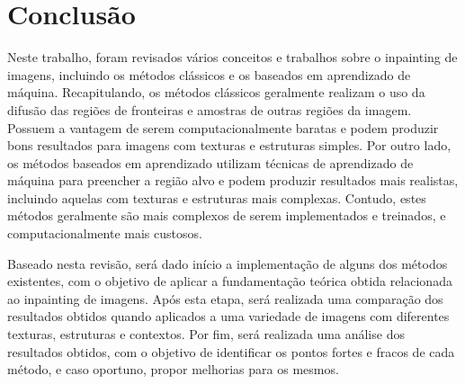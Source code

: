 
\section{Conclusão} \label{conclusion}
Neste trabalho, foram revisados vários conceitos e trabalhos sobre o inpainting de imagens, incluindo os métodos clássicos e os baseados em aprendizado de máquina. Recapitulando, os métodos clássicos geralmente realizam o uso da difusão das regiões de fronteiras e amostras de outras regiões da imagem. Possuem a vantagem de serem computacionalmente baratas e podem produzir bons resultados para imagens com texturas e estruturas simples. Por outro lado, os métodos baseados em aprendizado utilizam técnicas de aprendizado de máquina para preencher a região alvo e podem produzir resultados mais realistas, incluindo aquelas com texturas e estruturas mais complexas. Contudo, estes métodos geralmente são mais complexos de serem implementados e treinados, e computacionalmente mais custosos.

Baseado nesta revisão, será dado início a implementação de alguns dos métodos existentes, com o objetivo de aplicar a fundamentação teórica obtida relacionada ao inpainting de imagens. Após esta etapa, será realizada uma comparação dos resultados obtidos quando aplicados a uma variedade de imagens com diferentes texturas, estruturas e contextos. Por fim, será realizada uma análise dos resultados obtidos, com o objetivo de identificar os pontos fortes e fracos de cada método, e caso oportuno, propor melhorias para os mesmos.